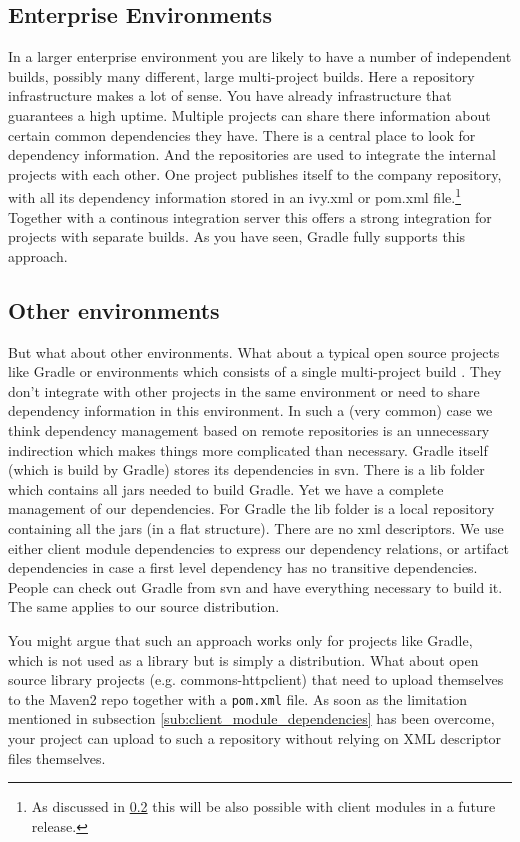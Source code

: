 \subsection{Enterprise Environments} %
\label{sub:enterprise_environments}
In a larger enterprise environment you are likely to have a number of independent builds, possibly many different, large multi-project builds. Here a repository infrastructure makes a lot of sense. You have already infrastructure that guarantees a high uptime. Multiple projects can share there information about certain common dependencies they have. There is a central place to look for dependency information. And the repositories are used to integrate the internal projects with each other. One project publishes itself to the company repository, with all its dependency information stored in an ivy.xml or pom.xml file.\footnote{As discussed in \ref{sub:other_environments} this will be also possible with client modules in a future release.} Together with a continous integration server this offers a strong integration for projects with separate builds. As you have seen, Gradle fully supports this approach.

\subsection{Other environments} %
\label{sub:other_environments}
But what about other environments. What about a typical open source projects like Gradle or environments which consists of a single multi-project build	. They don't integrate with other projects in the same environment or need to share dependency information in this environment. In such a (very common) case we think dependency management based on remote repositories is an unnecessary indirection which makes things more complicated than necessary. Gradle itself (which is build by Gradle) stores its dependencies in svn. There is a lib folder which contains all jars needed to build Gradle. Yet we have a complete management of our dependencies. For Gradle the lib folder is a local repository containing all the jars (in a flat structure). There are no xml descriptors. We use either client module dependencies to express our dependency relations, or artifact dependencies in case a first level dependency has no transitive dependencies. People can check out Gradle from svn and have everything necessary to build it. The same applies to our source distribution.

You might argue that such an approach works only for projects like Gradle, which is not used as a library but is simply a distribution. What about open source library projects (e.g. commons-httpclient) that need to upload themselves to the Maven2 repo together with a \texttt{pom.xml} file. As soon as the limitation mentioned in subsection \ref{sub:client_module_dependencies} has been overcome, your project can upload to such a repository without relying on XML descriptor files themselves.

